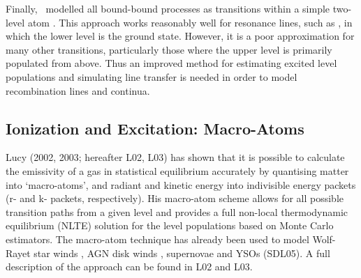 \documentclass[preprint, a4paper, 11pt]{aastex}
\begin{document}
Finally, \py\ modelled all bound-bound processes as transitions
within a simple two-level atom \cite[e.g.][]{mihalas}. This
approach works reasonably well for resonance  
lines, such as \civfull, in which the lower level is the ground state.  
However, it is a poor approximation for many other
transitions, particularly those where the upper level
is primarily populated from above. Thus an improved method for
estimating excited level populations and simulating line transfer is
needed in order to model recombination lines and continua.

\subsection{Ionization and Excitation: Macro-Atoms}

Lucy (2002, 2003\nocite{lucy2002, lucy2003}; hereafter L02, L03) 
has shown that it is possible to calculate the emissivity of a gas in
statistical equilibrium accurately by quantising matter into
`macro-atoms', and radiant and kinetic energy into indivisible energy
packets (r- and k- packets, respectively). His macro-atom scheme
allows for all possible transition paths from a given level and
provides a full non-local thermodynamic equilibrium (NLTE) solution
for the level populations based on Monte Carlo estimators. The macro-atom
technique has already been used to model Wolf-Rayet star
winds \citep{sim2004}, AGN disk winds \citep{simlong2008, tatum2012},
supernovae \citep{kromersim, kerzendorfsim} and YSOs (SDL05). A full 
description of the approach can be found in L02 and L03. 
\end{document}
